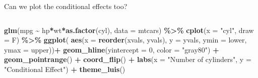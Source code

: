 \documentclass[australian,ignorenonframetext,aspectratio=169]{beamer}
\newenvironment{Shaded}{\begin{snugshade}}{\end{snugshade}}
\newcommand{\DataTypeTok}[1]{\textcolor[rgb]{0.13,0.29,0.53}{#1}}
\newcommand{\DecValTok}[1]{\textcolor[rgb]{0.00,0.00,0.81}{#1}}
\newcommand{\KeywordTok}[1]{\textcolor[rgb]{0.13,0.29,0.53}{\textbf{#1}}}
\newcommand{\NormalTok}[1]{#1}
\newcommand{\OperatorTok}[1]{\textcolor[rgb]{0.81,0.36,0.00}{\textbf{#1}}}
\newcommand{\StringTok}[1]{\textcolor[rgb]{0.31,0.60,0.02}{#1}}
\begin{document}
\begin{frame}[fragile]{Can we plot the conditional effects too?}
\protect\hypertarget{can-we-plot-the-conditional-effects-too}{}

\begin{columns}[T]
\begin{column}{0.5\textwidth}
\tiny

\begin{Shaded}
\begin{Highlighting}[]
\KeywordTok{glm}\NormalTok{(mpg }\OperatorTok{\textasciitilde{}}\StringTok{ }\NormalTok{hp}\OperatorTok{*}\NormalTok{wt}\OperatorTok{*}\KeywordTok{as.factor}\NormalTok{(cyl), }\DataTypeTok{data =}\NormalTok{ mtcars) }\OperatorTok{\%\textgreater{}\%}
\StringTok{  }\KeywordTok{cplot}\NormalTok{(}\DataTypeTok{x =} \StringTok{"cyl"}\NormalTok{, }\DataTypeTok{draw =}\NormalTok{ F) }\OperatorTok{\%\textgreater{}\%}
\StringTok{  }\KeywordTok{ggplot}\NormalTok{( }\KeywordTok{aes}\NormalTok{(}\DataTypeTok{x =} \KeywordTok{reorder}\NormalTok{(xvals, yvals),}
                      \DataTypeTok{y =}\NormalTok{ yvals, }\DataTypeTok{ymin =}\NormalTok{ lower, }\DataTypeTok{ymax =}\NormalTok{ upper))}\OperatorTok{+}
\StringTok{                      }\KeywordTok{geom\_hline}\NormalTok{(}\DataTypeTok{yintercept =} \DecValTok{0}\NormalTok{, }\DataTypeTok{color =} \StringTok{"gray80"}\NormalTok{) }\OperatorTok{+}
\StringTok{                      }\KeywordTok{geom\_pointrange}\NormalTok{() }\OperatorTok{+}\StringTok{ }\KeywordTok{coord\_flip}\NormalTok{() }\OperatorTok{+}
\StringTok{    }\KeywordTok{labs}\NormalTok{(}\DataTypeTok{x =} \StringTok{"Number of cylinders"}\NormalTok{, }\DataTypeTok{y =} \StringTok{"Conditional Effect"}\NormalTok{) }\OperatorTok{+}
\StringTok{    }\KeywordTok{theme\_luis}\NormalTok{()}
\end{Highlighting}
\end{Shaded}
\end{column}


\end{columns}
\end{frame}
\end{document}
